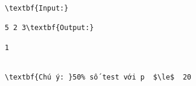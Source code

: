 \begin{verbatim}
\textbf{Input:}

5 2 3\textbf{Output:}

1


\textbf{Chú ý: }50% số test với p  $\le$  20
\end{verbatim}
